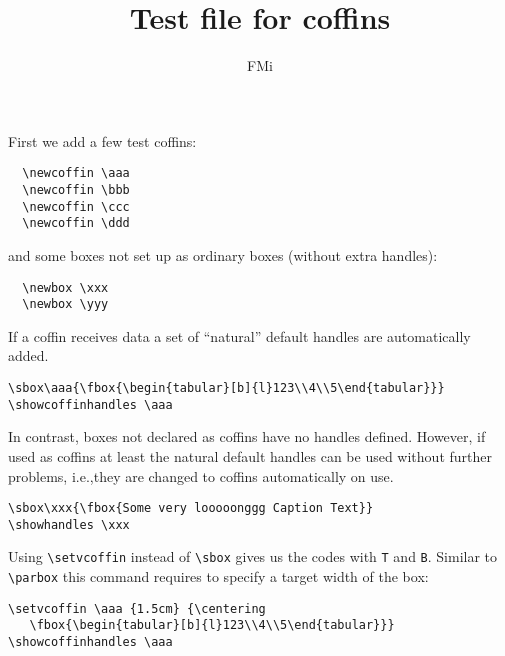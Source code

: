\documentclass{article}
\begin{document}
\title{Test file for coffins}
\author{FMi}
\maketitle

First we add a few test coffins:
\begin{verbatim}
  \newcoffin \aaa
  \newcoffin \bbb
  \newcoffin \ccc
  \newcoffin \ddd
\end{verbatim}
  \newcoffin \aaa
  \newcoffin \bbb
  \newcoffin \ccc
  \newcoffin \ddd
and some boxes not set up as ordinary boxes (without extra handles):
\begin{verbatim}
  \newbox \xxx
  \newbox \yyy
\end{verbatim}
  \newbox \xxx
  \newbox \yyy


If a coffin receives data a set of ``natural'' default handles are automatically added.
\begin{verbatim}
\sbox\aaa{\fbox{\begin{tabular}[b]{l}123\\4\\5\end{tabular}}}
\showcoffinhandles \aaa
\end{verbatim}
\sbox{}
\showcoffinhandles \aaa


In contrast, boxes not declared as coffins have no handles defined. However, if
used as coffins at least the natural default handles can be used without
further problems, i.e.,they are changed to coffins automatically on use.
\begin{verbatim}
\sbox\xxx{\fbox{Some very looooonggg Caption Text}}
\showhandles \xxx
\end{verbatim}
\sbox{}
\showcoffinhandles \xxx


Using \verb|\setvcoffin| instead of \verb|\sbox| gives us the codes with
\texttt{T} and \texttt{B}. Similar to \verb|\parbox| this command requires to
specify a target width of the box:
\begin{verbatim}
\setvcoffin \aaa {1.5cm} {\centering
   \fbox{\begin{tabular}[b]{l}123\\4\\5\end{tabular}}}
\showcoffinhandles \aaa
\end{verbatim}
\setvcoffin \aaa {1.5cm} {\centering
   }
\showcoffinhandles \aaa
\end{document}
